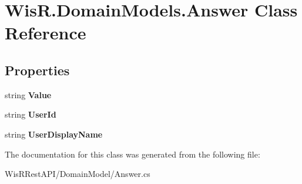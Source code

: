 \hypertarget{class_wis_r_1_1_domain_models_1_1_answer}{}\section{Wis\+R.\+Domain\+Models.\+Answer Class Reference}
\label{class_wis_r_1_1_domain_models_1_1_answer}
\subsection*{Properties}
\begin{DoxyCompactItemize}
\item 
\hypertarget{class_wis_r_1_1_domain_models_1_1_answer_a6fbdc3c61555a50935279436e887be59}{}string {\bfseries Value}\label{class_wis_r_1_1_domain_models_1_1_answer_a6fbdc3c61555a50935279436e887be59}

\item 
\hypertarget{class_wis_r_1_1_domain_models_1_1_answer_ac6d1fe5a50620d089680159aee750977}{}string {\bfseries User\+Id}\label{class_wis_r_1_1_domain_models_1_1_answer_ac6d1fe5a50620d089680159aee750977}

\item 
\hypertarget{class_wis_r_1_1_domain_models_1_1_answer_ae54c947f6a04d19f872bef0e092f675e}{}string {\bfseries User\+Display\+Name}\label{class_wis_r_1_1_domain_models_1_1_answer_ae54c947f6a04d19f872bef0e092f675e}

\end{DoxyCompactItemize}


The documentation for this class was generated from the following file\+:\begin{DoxyCompactItemize}
\item 
Wis\+R\+Rest\+A\+P\+I/\+Domain\+Model/Answer.\+cs\end{DoxyCompactItemize}
